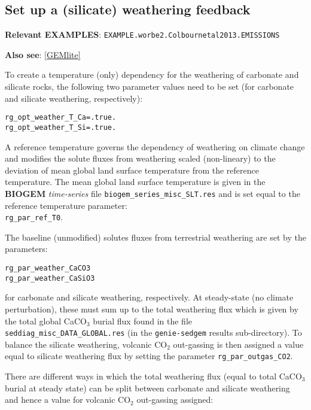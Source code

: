 \documentclass[10pt,twoside]{article}
\begin{document}
\subsection{Set up a (silicate) weathering feedback}\label{weatheringfeedback}

\noindent \textbf{Relevant EXAMPLES}: \texttt{EXAMPLE.worbe2.Colbournetal2013.EMISSIONS}

\noindent \textbf{Also see}: \ref{GEMlite}

\noindent To create a temperature (only) dependency for the weathering of carbonate and silicate rocks, the following two parameter values need to be set (for carbonate and silicate weathering, respectively):
\vspace{-10pt}\begin{verbatim}
rg_opt_weather_T_Ca=.true.
rg_opt_weather_T_Si=.true.
\end{verbatim}\vspace{-10pt}

A reference temperature governs the dependency of weathering on climate change and modifies the solute fluxes from weathering scaled (non-lineary) to the deviation of mean global land surface temperature from the reference temperature. The mean global land surface temperature is given in the \textbf{BIOGEM} \textit{time-series} file \texttt{biogem\_series\_misc\_SLT.res} and is set equal to the reference temperature parameter:
\\\texttt{rg\_par\_ref\_T0}.

The baseline (unmodified) solutes fluxes from terrestrial weathering are set by the parameters:
\vspace{-10pt}\begin{verbatim}
rg_par_weather_CaCO3
rg_par_weather_CaSiO3
\end{verbatim}\vspace{-10pt}
for carbonate and silicate weathering, respectively. At steady-state (no climate perturbation), these must sum up to the total weathering flux which is given by the total global CaCO$_{3}$ burial flux found in the file \texttt{seddiag\_misc\_DATA\_GLOBAL.res} (in the \texttt{genie-sedgem} results sub-directory).
To balance the silicate weathering, volcanic CO$_{2}$ out-gassing is then assigned a value equal to silicate weathering flux by setting the parameter \texttt{rg\_par\_outgas\_CO2}.

There are different ways in which the total weathering flux (equal to total CaCO$_{3}$ burial at steady state) can be split between carbonate and silicate weathering and hence a value for volcanic CO$_{2}$ out-gassing assigned:
\end{document}
